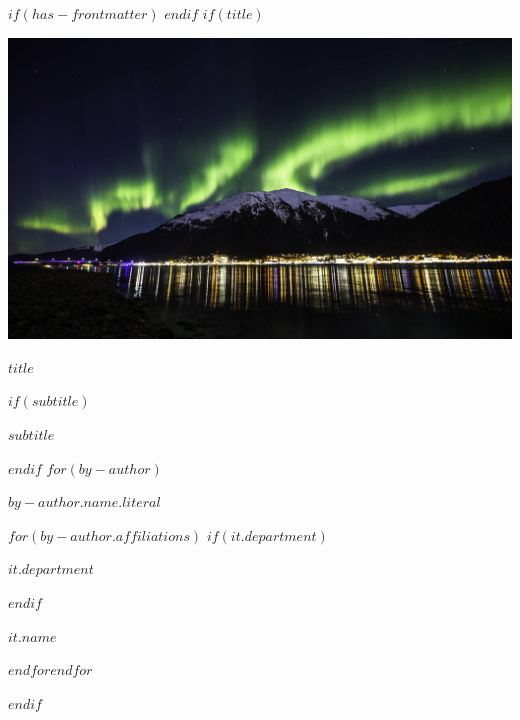 
$if(has-frontmatter)$
\frontmatter
$endif$
$if(title)$
\cleardoublepage
\thispagestyle{empty}
{\centering
\vspace*{-2cm}
\vspace{2ex}
\par\noindent\includegraphics[width=\textwidth]{images/jnu_aurora.jpeg}
\\
\vspace{7ex}
{\huge\bfseries\color{uafblue} $title$ \par}
\vspace{3ex}
$if(subtitle)$
{\Large $subtitle$ \par}
$endif$
\vspace{15ex}
$for(by-author)$
{\Large $by-author.name.literal$ \par}
\vspace{3ex}
\vspace{12ex}
$for(by-author.affiliations)$%
$if(it.department)$%
{\bfseries\large $it.department$ \par}
\vspace{3ex}
$endif$%
{\bfseries\large $it.name$ \par}
$endfor$$endfor$%
}
$endif$

